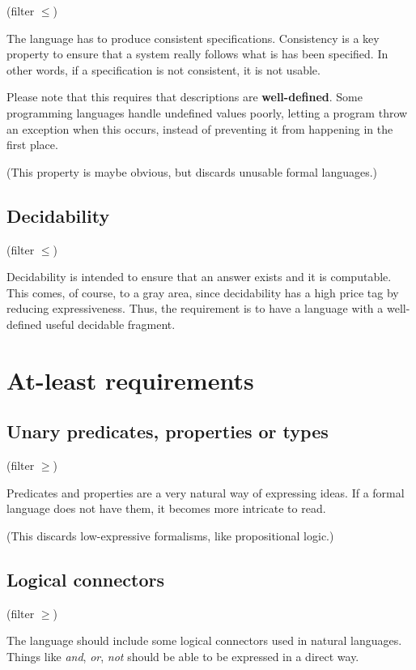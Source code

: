 (filter $\leq $)

The language has to produce consistent specifications.
Consistency is a key property to ensure that a system really follows what is has been specified.
In other words, if a specification is not consistent, it is not usable.

Please note that this requires that descriptions are \textbf{well-defined}.
Some programming languages handle undefined values poorly, letting a program throw an exception when this occurs, instead of preventing it from happening in the first place.

(This property is maybe obvious, but discards unusable formal languages.)

\subsection{Decidability}

(filter $\leq $)

Decidability is intended to ensure that an answer exists and it is computable.
This comes, of course, to a gray area, since decidability has a high price tag by reducing expressiveness.
Thus, the requirement is to have a language with a well-defined useful decidable fragment.


\section{At-least requirements}

\subsection{Unary predicates, properties or types}

(filter $\geq $)

Predicates and properties are a very natural way of expressing ideas.
If a formal language does not have them, it becomes more intricate to read.

(This discards low-expressive formalisms, like propositional logic.)

\subsection{Logical connectors}

(filter $\geq $)

The language should include some logical connectors used in natural languages.
Things like \textit{and}, \textit{or}, \textit{not} should be able to be expressed in a direct way.

